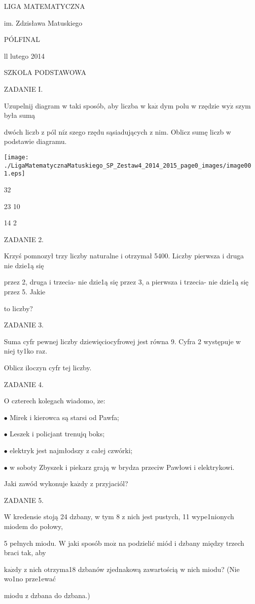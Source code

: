 \documentclass[a4paper,12pt]{article}
\begin{document}
LIGA MATEMATYCZNA

im. Zdzisława Matuskiego

PÓLFINAL

ll lutego 2014

SZKOLA PODSTAWOWA

ZADANIE I.

Uzupelnij diagram w taki sposób, aby liczba w $\mathrm{k}\mathrm{a}\dot{\mathrm{z}}$ dym polu w rzędzie $\mathrm{w}\mathrm{y}\dot{\mathrm{z}}$ szym była sumą

dwóch liczb z pól $\mathrm{n}\mathrm{i}\dot{\mathrm{z}}$ szego rzędu sąsiadujących z nim. Oblicz sumę liczb w podstawie diagramu.
\begin{center}
\texttt{[image: ./LigaMatematycznaMatuskiego\_SP\_Zestaw4\_2014\_2015\_page0\_images/image001.eps]}
\end{center}
32

23  10

14  2

ZADANIE 2.

Krzyś pomnozył trzy liczby naturalne i otrzymał 5400. Liczby pierwsza i druga nie dzie1ą się

przez 2, druga i trzecia- nie dzie1ą się przez 3, a pierwsza i trzecia- nie dzie1ą się przez 5. Jakie

to liczby?

ZADANIE 3.

Suma cyfr pewnej liczby dziewięciocyfrowej jest równa 9. Cyfra 2 występuje w niej ty1ko raz.

Oblicz iloczyn cyfr tej liczby.

ZADANIE 4.

$\mathrm{O}$ czterech kolegach wiadomo, $\dot{\mathrm{z}}\mathrm{e}$:

$\bullet$ Mirek i kierowca są starsi od Pawfa;

$\bullet$ Leszek i policjant trenujq boks;

$\bullet$ elektryk jest najmłodszy z całej czwórki;

$\bullet$ w soboty Zbyszek i piekarz grają w brydza przeciw Pawłowi i elektrykowi.

Jaki zawód wykonuje $\mathrm{k}\mathrm{a}\dot{\mathrm{z}}\mathrm{d}\mathrm{y}$ z przyjaciól?

ZADANIE 5.

$\mathrm{W}$ kredensie stoją 24 dzbany, w tym 8 z nich jest pustych, 11 wype1nionych miodem do połowy,

5 pełnych miodu. $\mathrm{W}$ jaki sposób $\mathrm{m}\mathrm{o}\dot{\mathrm{z}}$ na podzielić miód i dzbany między trzech braci tak, aby

$\mathrm{k}\mathrm{a}\dot{\mathrm{z}}\mathrm{d}\mathrm{y}$ z nich otrzyma18 dzbanów zjednakową zawartością w nich miodu? (Nie wo1no prze1ewać

miodu z dzbana do dzbana.)
\end{document}
